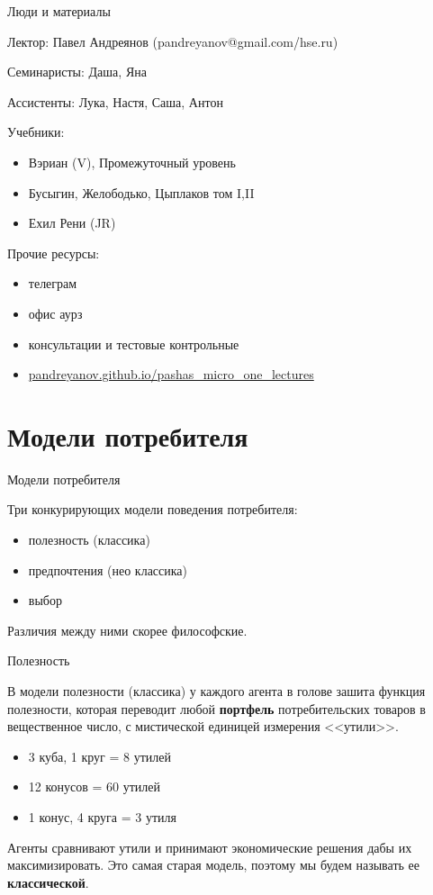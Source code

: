 \documentclass{beamer}
\begin{document}
\begin{frame}{Люди и материалы}

Лектор: Павел Андреянов (pandreyanov@gmail.com/hse.ru)

Семинаристы: Даша, Яна

Ассистенты: Лука, Настя, Саша, Антон

Учебники:
\begin{itemize}
\item Вэриан (V), Промежуточный уровень
\item Бусыгин, Желободько, Цыплаков том I,II
\item Ехил Рени (JR)
\end{itemize}

Прочие ресурсы:
\begin{itemize}
\item телеграм
\item офис аурз
\item консультации и тестовые контрольные
\item \url{pandreyanov.github.io/pashas_micro_one_lectures}
\end{itemize}

\end{frame}

\section{Модели потребителя}

\begin{frame}{Модели потребителя}

Три конкурирующих модели поведения потребителя:

\begin{itemize}
\item полезность (классика)
\item предпочтения (нео классика)
\item выбор
\end{itemize}

Различия между ними скорее философские.

\end{frame}

\begin{frame}{Полезность}

В модели полезности (классика) у каждого агента в голове зашита функция полезности, которая переводит любой \textbf{портфель} потребительских товаров в вещественное число, с мистической единицей измерения <<утили>>.

\begin{itemize}
\item 3 куба, 1 круг = 8 утилей
\item 12 конусов = 60 утилей
\item 1 конус, 4 круга = 3 утиля
\end{itemize}

Агенты сравнивают утили и принимают экономические решения дабы их максимизировать. Это самая старая модель, поэтому мы будем называть ее \textbf{классической}.

\end{frame}
\end{document}
